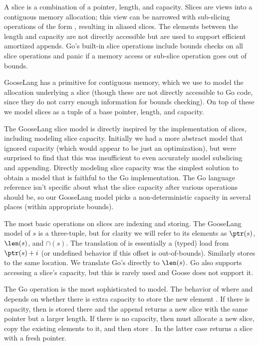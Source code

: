 A slice is a combination of a pointer, length, and capacity. Slices are
views into a contiguous memory allocation; this view can be narrowed
with sub-slicing operations of the form , resulting
in aliased slices. The elements between the length and capacity are not
directly accessible but are used to support efficient amortized appends.
Go's built-in slice operations include bounds checks on all slice
operations and panic if a memory access or sub-slice operation goes out
of bounds.

GooseLang has a primitive for contiguous memory, which we use to model
the allocation underlying a slice (though these are not directly
accessible to Go code, since they do not carry enough information for
bounds checking). On top of these we model slices as a tuple of a base
pointer, length, and capacity.

The GooseLang slice model is directly inspired by the implementation of
slices, including modeling slice capacity. Initially we had a more
abstract model that ignored capacity (which would appear to be just an
optimization), but were surprised to find that this was insufficient to
even accurately model subslicing and appending. Directly modeling slice
capacity was the simplest solution to obtain a model that is faithful to
the Go implementation. The Go language reference isn't specific about
what the slice capacity after various operations should be, so our
GooseLang model picks a non-deterministic capacity in several places
(within appropriate bounds).


The most basic operations on slices are indexing and storing. The
GooseLang model of $s$ is a three-tuple, but for clarity we will refer
to its elements as $\ptr(s)$, $\len(s)$, and $\cap(s)$. The
translation of  is essentially a (typed) load from
$\ptr(s) + i$ (or undefined behavior if this offset is out-of-bounds).
Similarly  stores to the same location. We
translate Go's  directly to $\len(s)$. Go also supports
accessing a slice's capacity, but this is rarely used and Goose does not
support it.

The Go  operation is the most sophisticated to model. The
behavior of  where  and
 depends on whether there is extra capacity to store the
new element . If there is capacity, then  is stored
there and the append returns a new slice with the same pointer but a
larger length. If there is no capacity, then  must
allocate a new slice, copy the existing elements to it, and then store
. In the latter case  returns a slice with a
fresh pointer.

